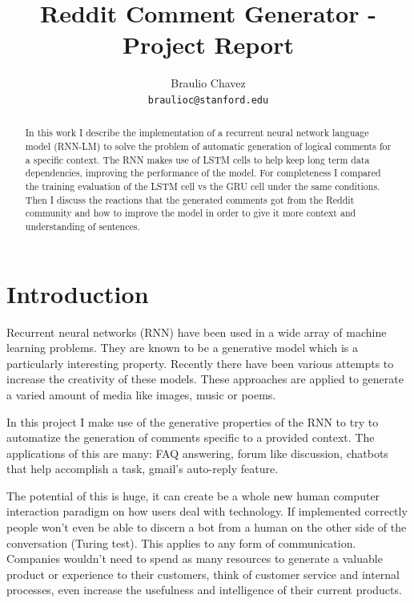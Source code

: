 \documentclass{article} %
\begin{document}
\title{Reddit Comment Generator - Project Report}
\author{Braulio Chavez \\
  \texttt{braulioc@stanford.edu}}
\maketitle

\begin{abstract}
In this work I describe the implementation of a recurrent neural network
language model (RNN-LM) to solve the problem of automatic generation of logical
comments for a specific context. The RNN makes use of LSTM cells to help keep
long term data dependencies, improving the performance of the model. For
completeness I compared the training evaluation of the LSTM cell vs the GRU cell
under the same conditions. Then I discuss the reactions that the generated
comments got from the Reddit community and how to improve the model in order to
give it more context and understanding of sentences.  \end{abstract}

\section{Introduction}
Recurrent neural networks (RNN) have been used in a wide array of machine
learning problems. They are known to be a generative model which is a
particularly interesting property. Recently there have been various attempts to
increase the creativity of these models. These approaches are applied to
generate a varied amount of media like images, music or poems.

In this project I make use of the generative properties of the RNN to try to
automatize the generation of comments specific to a provided context. The
applications of this are many: FAQ answering, forum like discussion, chatbots
that help accomplish a task, gmail's auto-reply feature.

The potential of this is huge, it can create be a whole new human computer
interaction paradigm on how users deal with technology. If implemented correctly
people won't even be able to discern a bot from a human on the other side of the
conversation (Turing test). This applies to any form of communication. Companies
wouldn't need to spend as many resources to generate a valuable product or
experience to their customers, think of customer service and internal processes,
even increase the usefulness and intelligence of their current products.
\end{document}
